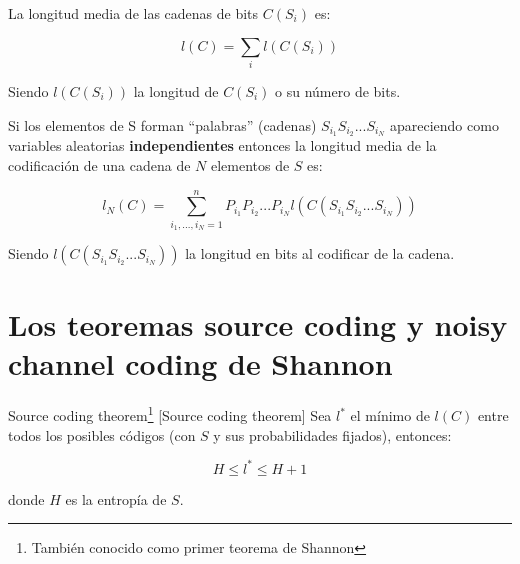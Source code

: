 	\begin{defn}
		La longitud media de las cadenas de bits $C(S_i)$ es:

		$$ l(C) = \sum_i l(C(S_i))$$

		Siendo $l(C(S_i))$ la longitud de $C(S_i)$ o su número de bits.
	\end{defn}

	Si los elementos de S forman ``palabras'' (cadenas) $S_{i_1} S_{i_2} ... S_{i_N}$ apareciendo como variables aleatorias \textbf{independientes} entonces la longitud media de la codificación de una cadena de $N$ elementos de $S$ es:

	$$l_{N}(C) = \sum_{i_1,...,i_N = 1}^{n} P_{i_1} P_{i_2} ... P_{i_N} l(C(S_{i_1} S_{i_2} ... S_{i_N}))$$

	Siendo $l(C(S_{i_1} S_{i_2} ... S_{i_N}))$ la longitud en bits al codificar de la cadena.

\section{Los teoremas source coding y noisy channel coding de Shannon}

	\begin{theorem}{Source coding theorem\footnote{También conocido como primer teorema de Shannon} }[Source coding theorem] \label{SourceCoding}
		Sea $l^*$ el mínimo de $l(C)$ entre todos los posibles códigos (con $S$ y sus probabilidades fijados), entonces:

		$$ H \leq l^* \leq H + 1 $$

		donde $H$ es la entropía de $S$.

	\end{theorem}


